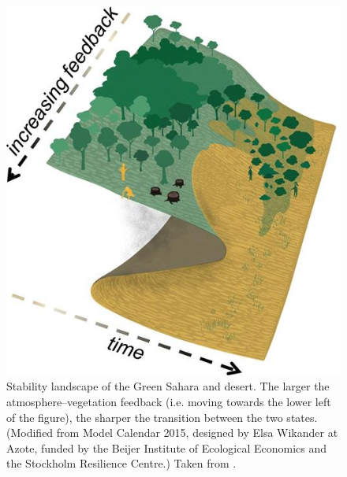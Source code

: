 \begin{figure}[bhtp]
	\centering
	\includegraphics[width=0.4\columnwidth]{Images/Metrics/sahel_multistable}
	\caption{Stability landscape of the Green Sahara and desert. The larger the atmosphere–vegetation feedback (i.e. moving towards the lower left of the figure), the sharper the transition between the two states. (Modified from Model Calendar 2015, designed by Elsa Wikander at Azote, funded by the Beijer Institute of Ecological Economics and the Stockholm Resilience Centre.) Taken from \cite{Bathiany2016}.}
	\label{fig: climate_bistability}
\end{figure}




%

